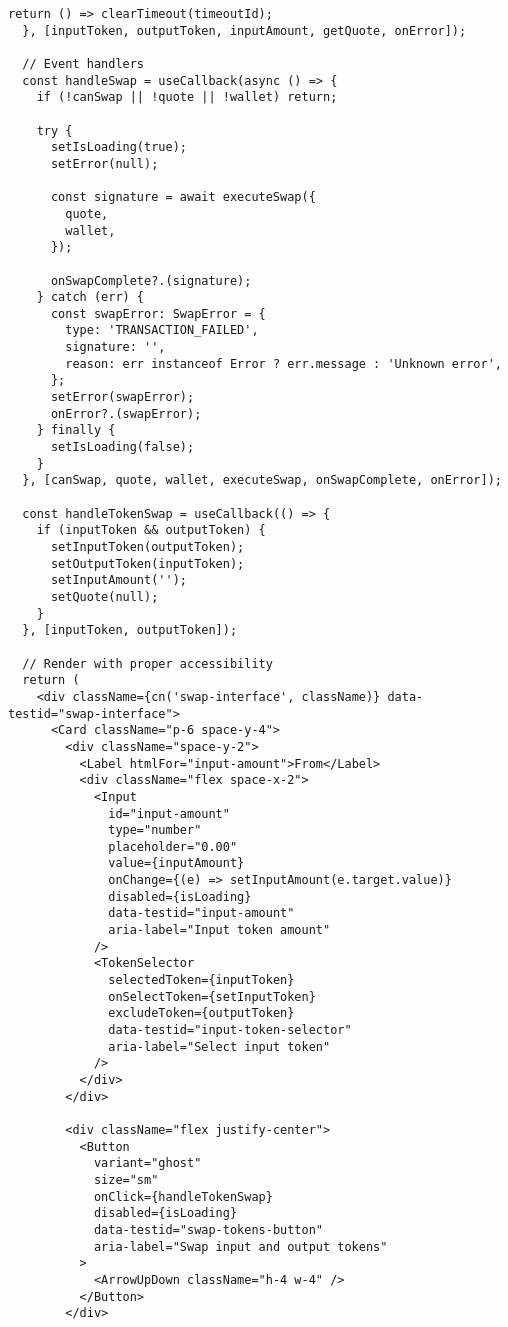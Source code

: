 \documentclass[11pt,a4paper]{article}
\begin{document}
\begin{lstlisting}[style=typescript, caption=React Component Standards]
    return () => clearTimeout(timeoutId);
  }, [inputToken, outputToken, inputAmount, getQuote, onError]);

  // Event handlers
  const handleSwap = useCallback(async () => {
    if (!canSwap || !quote || !wallet) return;

    try {
      setIsLoading(true);
      setError(null);

      const signature = await executeSwap({
        quote,
        wallet,
      });

      onSwapComplete?.(signature);
    } catch (err) {
      const swapError: SwapError = {
        type: 'TRANSACTION_FAILED',
        signature: '',
        reason: err instanceof Error ? err.message : 'Unknown error',
      };
      setError(swapError);
      onError?.(swapError);
    } finally {
      setIsLoading(false);
    }
  }, [canSwap, quote, wallet, executeSwap, onSwapComplete, onError]);

  const handleTokenSwap = useCallback(() => {
    if (inputToken && outputToken) {
      setInputToken(outputToken);
      setOutputToken(inputToken);
      setInputAmount('');
      setQuote(null);
    }
  }, [inputToken, outputToken]);

  // Render with proper accessibility
  return (
    <div className={cn('swap-interface', className)} data-testid="swap-interface">
      <Card className="p-6 space-y-4">
        <div className="space-y-2">
          <Label htmlFor="input-amount">From</Label>
          <div className="flex space-x-2">
            <Input
              id="input-amount"
              type="number"
              placeholder="0.00"
              value={inputAmount}
              onChange={(e) => setInputAmount(e.target.value)}
              disabled={isLoading}
              data-testid="input-amount"
              aria-label="Input token amount"
            />
            <TokenSelector
              selectedToken={inputToken}
              onSelectToken={setInputToken}
              excludeToken={outputToken}
              data-testid="input-token-selector"
              aria-label="Select input token"
            />
          </div>
        </div>

        <div className="flex justify-center">
          <Button
            variant="ghost"
            size="sm"
            onClick={handleTokenSwap}
            disabled={isLoading}
            data-testid="swap-tokens-button"
            aria-label="Swap input and output tokens"
          >
            <ArrowUpDown className="h-4 w-4" />
          </Button>
        </div>


\end{lstlisting}
\end{document}
